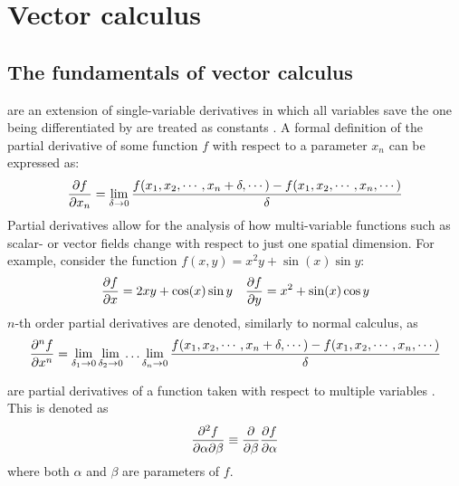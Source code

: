 \section{Vector calculus}
\subsection{The fundamentals of vector calculus}

\begin{defn}
	 are an extension of single-variable derivatives in which all variables save
	the one being differentiated by are treated as constants \cite{MORTIMER201389}. A formal definition of the
	partial derivative of some function $f$ with respect to a parameter $x_n$ can be expressed as:
	\begin{equation}
		\pdv{f}{x_n}=\lim_{\delta\rightarrow0}\frac{f(x_1,x_2,\cdots,x_n+\delta,\cdots)-f(x_1,x_2,\cdots,x_n,\cdots)}{\delta}
	\end{equation}
	Partial derivatives allow for the analysis of how multi-variable functions such as scalar- or vector fields change
	with respect to just one spatial dimension. For example, consider the function $f(x,y)=x^2y+\sin(x)\sin y$:
	\begin{align*}
		\pdv{f}{x}=2xy+\cos(x)\sin y&&\pdv{f}{y}=x^2+\sin(x)\cos y
	\end{align*}
	$n$-th order partial derivatives are denoted, similarly to normal calculus, as
	$$
	\pdv[n]{f}{x}=\lim_{\delta_1\rightarrow0}\lim_{\delta_2\rightarrow0}\hdots\lim_{\delta_n\rightarrow0}\frac{f(x_1,x_2,\cdots,x_n+\delta,\cdots)-f(x_1,x_2,\cdots,x_n,\cdots)}{\delta}
	$$
\end{defn}
\begin{defn}
	 are partial derivatives of a function taken with respect to multiple
	variables \cite{GARRETT2015377}. This is denoted as
	$$
	\pdv{f}{\alpha}{\beta}\equiv\pdv{\beta}\pdv{f}{\alpha}
	$$
	where both $\alpha$ and $\beta$ are parameters of $f$.
\end{defn}
